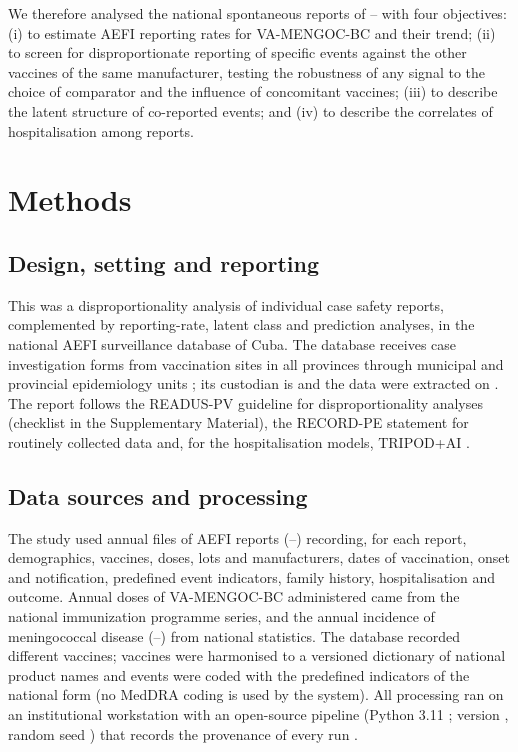 \documentclass[11pt]{article}
\begin{document}
We therefore analysed the national spontaneous reports of \VStudyFirstYear--\VStudyLastYear{}
with four objectives: (i) to
estimate AEFI reporting rates for VA-MENGOC-BC and their trend; (ii) to screen for
disproportionate reporting of specific events against the other vaccines of the same
manufacturer, testing the robustness of any signal to the choice of comparator and the influence
of concomitant vaccines; (iii) to describe the latent structure of co-reported
events; and (iv) to describe the correlates of hospitalisation among reports.

\section{Methods}\label{sec:methods}

\subsection{Design, setting and reporting}\label{sec:design}
This was a disproportionality analysis of individual case safety reports, complemented by
reporting-rate, latent class and prediction analyses, in the national AEFI surveillance database of
Cuba. The database receives case investigation forms from vaccination sites in all provinces through
municipal and provincial epidemiology units \cite{Galindo2012,WHO2016AEFI}; its custodian is
\VCustodian{} and the data were extracted on \VExtractionDate. The report follows the READUS-PV guideline for
disproportionality analyses \cite{Fusaroli2024Statement,Fusaroli2024Elaboration} (checklist in
the Supplementary Material), the RECORD-PE statement for routinely collected data
\cite{Langan2018} and, for the hospitalisation models, TRIPOD+AI \cite{Collins2024}.

\subsection{Data sources and processing}\label{sec:data}
The study used \VNFiles{} annual files of AEFI reports (\VStudyFirstYear--\VStudyLastYear) recording,
for each report, demographics, vaccines, doses, lots and manufacturers, dates of
vaccination, onset and notification, \PONEventsScreened{} predefined event indicators, family history,
hospitalisation and outcome. Annual doses of VA-MENGOC-BC administered came from the national
immunization programme series, and the annual incidence of meningococcal disease
(\POITSFirstYear--\POITSLastYear) from national statistics. The database recorded
\PONVaccines{} different vaccines; vaccines were harmonised to a versioned dictionary of
national product names and events were coded with the predefined indicators of the national
form (no MedDRA coding is used by the system). All processing ran on an institutional workstation with an open-source
pipeline (Python 3.11 \cite{Harris2020,Virtanen2020,McKinney2010,Seabold2010,Pedregosa2011,Hunter2007};
version \VCodeVersion, random seed \VSeed) that records the provenance of every run
\cite{Sandve2013,MHRA2018}.
\end{document}
